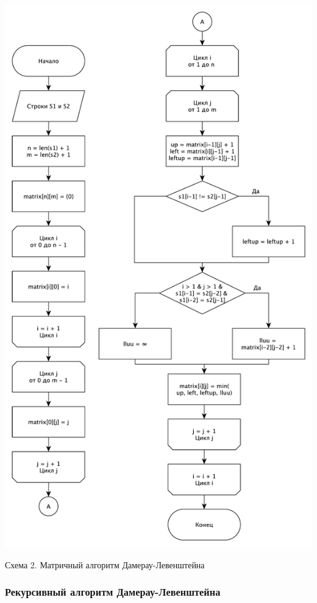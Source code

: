 \documentclass[a4paper,12pt]{article}
\begin{document}
\begin{center}
    \includegraphics[scale=0.35]{DLmatrix}

    Схема 2. Матричный алгоритм Дамерау-Левенштейна
\end{center}

\subsubsection{Рекурсивный алгоритм Дамерау-Левенштейна}
\end{document}
